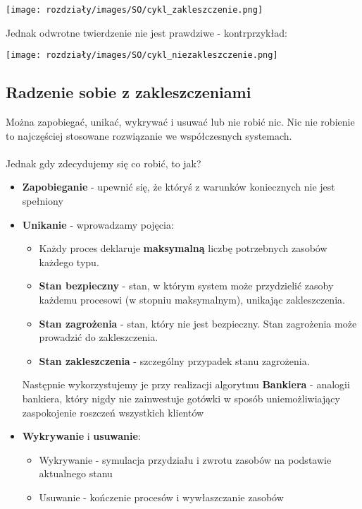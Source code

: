 \begin{center}
            \texttt{[image: rozdziały/images/SO/cykl\_zakleszczenie.png]}
    
\end{center}

Jednak odwrotne twierdzenie nie jest prawdziwe - kontrprzykład:

\begin{center}
            \texttt{[image: rozdziały/images/SO/cykl\_niezakleszczenie.png]}
    
\end{center}


\subsection{Radzenie sobie z zakleszczeniami}

Można zapobiegać, unikać, wykrywać i usuwać lub nie robić nic. Nic nie robienie to najczęściej stosowane rozwiązanie we współczesnych systemach. \\\\ Jednak gdy zdecydujemy się co robić, to jak?

\begin{itemize}
    \item \textbf{Zapobieganie} -  upewnić się, że któryś z warunków koniecznych nie jest spełniony
    \item \textbf{Unikanie} - wprowadzamy pojęcia:
        \begin{itemize}
            \item Każdy proces deklaruje \textbf{maksymalną} liczbę potrzebnych zasobów każdego typu.
            \item \textbf{Stan bezpieczny} - stan, w którym system może przydzielić zasoby każdemu procesowi (w stopniu maksymalnym), unikając zakleszczenia. 
            \item \textbf{Stan zagrożenia} - stan, który nie jest bezpieczny. Stan zagrożenia może prowadzić do zakleszczenia.
            \item \textbf{Stan zakleszczenia} - szczególny przypadek stanu zagrożenia.
        \end{itemize}
        Następnie wykorzystujemy je przy realizacji algorytmu \textbf{Bankiera} - analogii bankiera, który nigdy nie zainwestuje gotówki w sposób uniemożliwiający zaspokojenie roszczeń wszystkich klientów
    \item \textbf{Wykrywanie} i \textbf{usuwanie}:
        \begin{itemize}
            \item Wykrywanie - symulacja przydziału i zwrotu zasobów na podstawie aktualnego stanu
            \item Usuwanie - kończenie procesów i wywłaszczanie zasobów
        \end{itemize}
\end{itemize}

